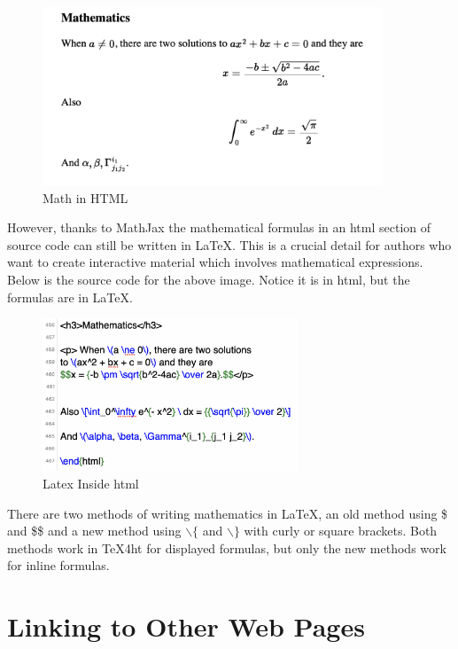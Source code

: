 \documentclass[11pt, oneside]{article}   	%
\begin{document}
 \begin{figure}[htbp] %
     \centering
     \includegraphics[width=4in]{image4.png} 
     \caption{Math in HTML}
     \label{fig:example}
  \end{figure}
  

 \newpage 
  However, thanks to MathJax the mathematical formulas in an html section of source code
  can still be written in LaTeX. This is a crucial detail for authors who want to create interactive
  material which involves mathematical expressions. Below is the source code for the above
  image. Notice it is in html, but the formulas are in LaTeX.
  
   \begin{figure}[htbp] %
     \centering
     \includegraphics[width=3in]{image6.png} 
     \caption{Latex Inside html}
     \label{fig:example}
  \end{figure}

 There are two methods of writing mathematics in LaTeX, an old method using
\$ and \$\$ and a new method using $\backslash$$\{$ and $\backslash$$\}$ with curly
or square brackets. Both methods work in TeX4ht for displayed formulas, but only
the new methods work for inline formulas. 

\section{Linking to Other Web Pages}
\end{document}
